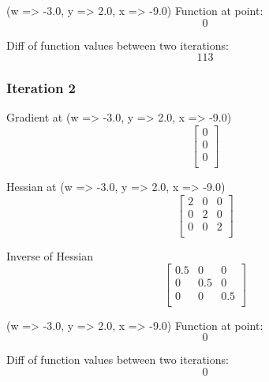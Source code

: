 \documentclass{article}
\begin{document}
(w => -3.0, y => 2.0, x => -9.0)
Function at point:
\begin{equation}
0
\end{equation}

Diff of function values between two iterations:
\begin{equation}
113
\end{equation}

\subsubsection{Iteration 2}
Gradient at (w => -3.0, y => 2.0, x => -9.0)
\begin{equation}
\left[
\begin{array}{c}
0 \\
0 \\
0 \\
\end{array}
\right]
\end{equation}

Hessian at (w => -3.0, y => 2.0, x => -9.0)
\begin{equation}
\left[
\begin{array}{ccc}
2 & 0 & 0 \\
0 & 2 & 0 \\
0 & 0 & 2 \\
\end{array}
\right]
\end{equation}

Inverse of Hessian
\begin{equation}
\left[
\begin{array}{ccc}
0.5 & 0 & 0 \\
0 & 0.5 & 0 \\
0 & 0 & 0.5 \\
\end{array}
\right]
\end{equation}

(w => -3.0, y => 2.0, x => -9.0)
Function at point:
\begin{equation}
0
\end{equation}

Diff of function values between two iterations:
\begin{equation}
0
\end{equation}
\end{document}
